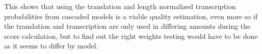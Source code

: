 This shows that using the translation and length normalized transcription probabilities from cascaded models is a viable quality estimation, even more so if the translation and transcription are only used in differing amounts during the score calculation, but to find out the right weights testing would have to be done as it seems to differ by model.



